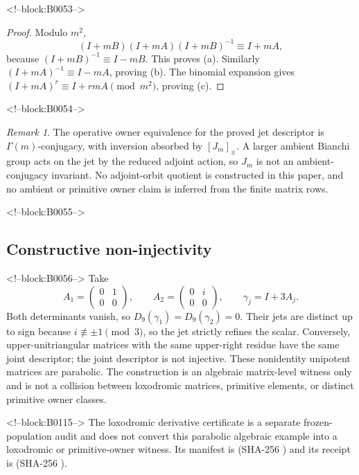 \documentclass[11pt,a4paper]{article}
\theoremstyle{definition}
\theoremstyle{remark}
\newtheorem{remark}[theorem]{Remark}
\begin{document}
<!--block:B0053-->
\begin{proof}
Modulo \(m^2\),
\[
 (I+mB)(I+mA)(I+mB)^{-1}\equiv I+mA,
\]
because \((I+mB)^{-1}\equiv I-mB\). This proves (a). Similarly \((I+mA)^{-1}\equiv I-mA\), proving (b). The binomial expansion gives \((I+mA)^r\equiv I+rmA\pmod{m^2}\), proving (c).
\end{proof}

<!--block:B0054-->
\begin{remark}
The operative owner equivalence for the proved jet descriptor is \(\Gamma(m)\)-conjugacy, with inversion absorbed by \([J_m]_{\pm}\). A larger ambient Bianchi group acts on the jet by the reduced adjoint action, so \(J_m\) is not an ambient-conjugacy invariant. No adjoint-orbit quotient is constructed in this paper, and no ambient or primitive owner claim is inferred from the finite matrix rows.
\end{remark}

<!--block:B0055-->
\subsection{Constructive non-injectivity}

<!--block:B0056-->
Take
\[
 A_1=\begin{pmatrix}0&1\\0&0\end{pmatrix},\qquad
 A_2=\begin{pmatrix}0&i\\0&0\end{pmatrix},\qquad
 \gamma_j=I+3A_j.
\]
Both determinants vanish, so \(D_9(\gamma_1)=D_9(\gamma_2)=0\). Their jets are distinct up to sign because \(i\not\equiv\pm1\pmod3\), so the jet strictly refines the scalar. Conversely, upper-unitriangular matrices with the same upper-right residue have the same joint descriptor; the joint descriptor is not injective. These nonidentity unipotent matrices are parabolic. The construction is an algebraic matrix-level witness only and is not a collision between loxodromic matrices, primitive elements, or distinct primitive owner classes.

<!--block:B0115-->
The loxodromic derivative certificate is a separate frozen-population audit and does not convert this parabolic algebraic example into a loxodromic or primitive-owner witness. Its manifest is  (SHA-256 ) and its receipt is  (SHA-256 ).
\end{document}
